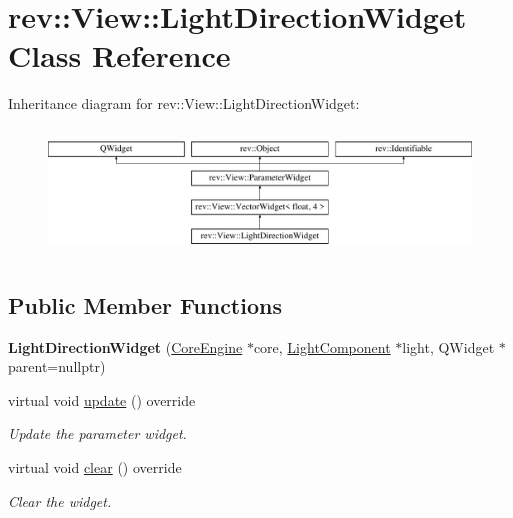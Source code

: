 \hypertarget{classrev_1_1_view_1_1_light_direction_widget}{}\section{rev\+::View\+::Light\+Direction\+Widget Class Reference}
\label{classrev_1_1_view_1_1_light_direction_widget}
Inheritance diagram for rev\+::View\+::Light\+Direction\+Widget\+:\begin{figure}[H]
\begin{center}
\leavevmode
\includegraphics[height=3.409437cm]{classrev_1_1_view_1_1_light_direction_widget}
\end{center}
\end{figure}
\subsection*{Public Member Functions}
\begin{DoxyCompactItemize}
\item 
\mbox{\label{classrev_1_1_view_1_1_light_direction_widget_a33d3706bc152a9055d32e46230f30b60}} 
{\bfseries Light\+Direction\+Widget} (\mbox{\hyperlink{classrev_1_1_core_engine}{Core\+Engine}} $\ast$core, \mbox{\hyperlink{classrev_1_1_light_component}{Light\+Component}} $\ast$light, Q\+Widget $\ast$parent=nullptr)
\item 
\mbox{\label{classrev_1_1_view_1_1_light_direction_widget_a3431427f2852722606899f84358b21c6}} 
virtual void \mbox{\hyperlink{classrev_1_1_view_1_1_light_direction_widget_a3431427f2852722606899f84358b21c6}{update}} () override
\begin{DoxyCompactList}\small\item\em Update the parameter widget. \end{DoxyCompactList}\item 
\mbox{\label{classrev_1_1_view_1_1_light_direction_widget_ac621e8d26a580a22f74036c89ee1fed6}} 
virtual void \mbox{\hyperlink{classrev_1_1_view_1_1_light_direction_widget_ac621e8d26a580a22f74036c89ee1fed6}{clear}} () override
\begin{DoxyCompactList}\small\item\em Clear the widget. \end{DoxyCompactList}\end{DoxyCompactItemize}
